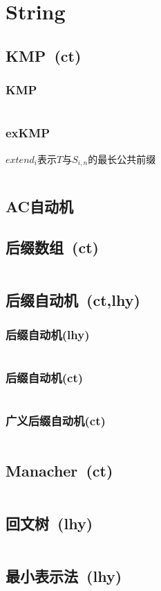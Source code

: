 \chapter{String}
\section{KMP\ \small(ct)}
	\subsection*{KMP}
		\inputminted{cpp}{String/kmp.cpp}
	\subsection*{exKMP}
		$ extend_i $表示$ T $与$ S_{i,n} $的最长公共前缀
		\inputminted{cpp}{String/ex_kmp.cpp}
\section{AC自动机}
\section{后缀数组\ \small(ct)}
	\inputminted{cpp}{String/suffix_array.cpp}
\section{后缀自动机\ \small(ct,lhy)}
	\subsection*{后缀自动机(lhy)}
		\inputminted{cpp}{String/suffix_automaton.cpp}
	\subsection*{后缀自动机(ct)}
		\inputminted{cpp}{String/suffix_automaton.cpp}
	\subsection*{广义后缀自动机(ct)}
		\inputminted{cpp}{String/general_suffix_automaton.cpp}
\section{Manacher\ \small(ct)}
	\inputminted{cpp}{String/manacher.cpp}
\section{回文树\ \small(lhy)}
	\inputminted{cpp}{String/palindromic_tree.cpp}
\section{最小表示法\ \small(lhy)}
	\inputminted{cpp}{String/minimal_rounding_string.cpp}